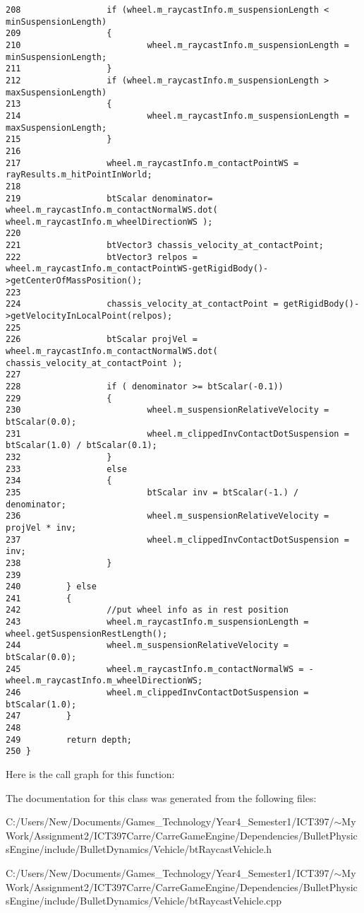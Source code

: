 \begin{Code}
\begin{verbatim}
208                 if (wheel.m_raycastInfo.m_suspensionLength < minSuspensionLength)
209                 {
210                         wheel.m_raycastInfo.m_suspensionLength = minSuspensionLength;
211                 }
212                 if (wheel.m_raycastInfo.m_suspensionLength > maxSuspensionLength)
213                 {
214                         wheel.m_raycastInfo.m_suspensionLength = maxSuspensionLength;
215                 }
216 
217                 wheel.m_raycastInfo.m_contactPointWS = rayResults.m_hitPointInWorld;
218 
219                 btScalar denominator= wheel.m_raycastInfo.m_contactNormalWS.dot( wheel.m_raycastInfo.m_wheelDirectionWS );
220 
221                 btVector3 chassis_velocity_at_contactPoint;
222                 btVector3 relpos = wheel.m_raycastInfo.m_contactPointWS-getRigidBody()->getCenterOfMassPosition();
223 
224                 chassis_velocity_at_contactPoint = getRigidBody()->getVelocityInLocalPoint(relpos);
225 
226                 btScalar projVel = wheel.m_raycastInfo.m_contactNormalWS.dot( chassis_velocity_at_contactPoint );
227 
228                 if ( denominator >= btScalar(-0.1))
229                 {
230                         wheel.m_suspensionRelativeVelocity = btScalar(0.0);
231                         wheel.m_clippedInvContactDotSuspension = btScalar(1.0) / btScalar(0.1);
232                 }
233                 else
234                 {
235                         btScalar inv = btScalar(-1.) / denominator;
236                         wheel.m_suspensionRelativeVelocity = projVel * inv;
237                         wheel.m_clippedInvContactDotSuspension = inv;
238                 }
239                         
240         } else
241         {
242                 //put wheel info as in rest position
243                 wheel.m_raycastInfo.m_suspensionLength = wheel.getSuspensionRestLength();
244                 wheel.m_suspensionRelativeVelocity = btScalar(0.0);
245                 wheel.m_raycastInfo.m_contactNormalWS = - wheel.m_raycastInfo.m_wheelDirectionWS;
246                 wheel.m_clippedInvContactDotSuspension = btScalar(1.0);
247         }
248 
249         return depth;
250 }
\end{verbatim}
\end{Code}




Here is the call graph for this function:

The documentation for this class was generated from the following files:\begin{CompactItemize}
\item 
C:/Users/New/Documents/Games\_\-Technology/Year4\_\-Semester1/ICT397/$\sim$My Work/Assignment2/ICT397Carre/CarreGameEngine/Dependencies/BulletPhysicsEngine/include/BulletDynamics/Vehicle/btRaycastVehicle.h\item 
C:/Users/New/Documents/Games\_\-Technology/Year4\_\-Semester1/ICT397/$\sim$My Work/Assignment2/ICT397Carre/CarreGameEngine/Dependencies/BulletPhysicsEngine/include/BulletDynamics/Vehicle/btRaycastVehicle.cpp\end{CompactItemize}
